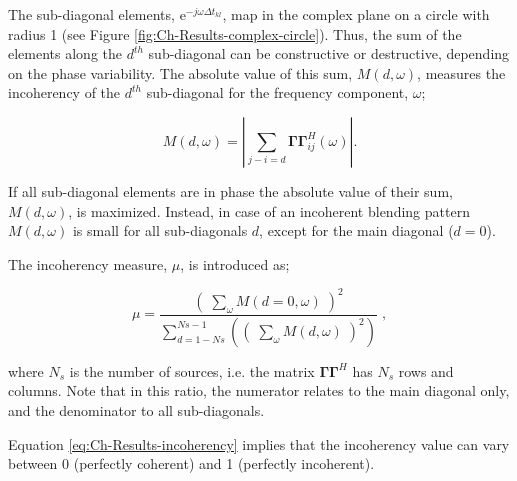 The sub-diagonal elements, $\mathrm{e}^{-j \omega \Delta t_{kl}}$, map in the complex plane on a circle with radius 1 (see Figure \ref{fig:Ch-Results-complex-circle}). Thus, the sum of the elements along the $d^{th}$ sub-diagonal can be constructive or destructive, depending on the phase variability. The absolute value of this sum, $M(d,\omega)$, measures the incoherency of the $d^{th}$ sub-diagonal for the frequency component, $\omega$;

\begin{equation}
	M(d,\omega) = \left| \sum_{j-i=d} \mathbf{\Gamma \Gamma}^H_{ij} (\omega) \right|.
	\label{eq:Ch-Results-incoherency-diagsum}	
\end{equation} 

If all sub-diagonal elements are in phase the absolute value of their sum, $M(d,\omega)$, is maximized. Instead, in case of an incoherent blending pattern $M(d,\omega)$ is small for all sub-diagonals $d$, except for the main diagonal ($d = 0$).  

The incoherency measure, $\mu$, is introduced as;

\begin{equation}
	\mu = \frac{\left( \; \sum_{\omega}M(d=0,\omega) \; \right)^2}{\sum_{d = 1-Ns}^{Ns-1} \left(\left( \; \sum_{\omega}M(d,\omega) \; \right)^2\right)} \; ,
	\label{eq:Ch-Results-incoherency}
\end{equation}

where $N_s$ is the number of sources, i.e. the matrix $\mathbf{\Gamma \Gamma}^H$ has $N_s$ rows and columns. Note that in this ratio, the numerator relates to the main diagonal only, and the denominator to all sub-diagonals.

Equation \ref{eq:Ch-Results-incoherency} implies that the incoherency value can vary between 0 (perfectly coherent) and 1 (perfectly incoherent).


